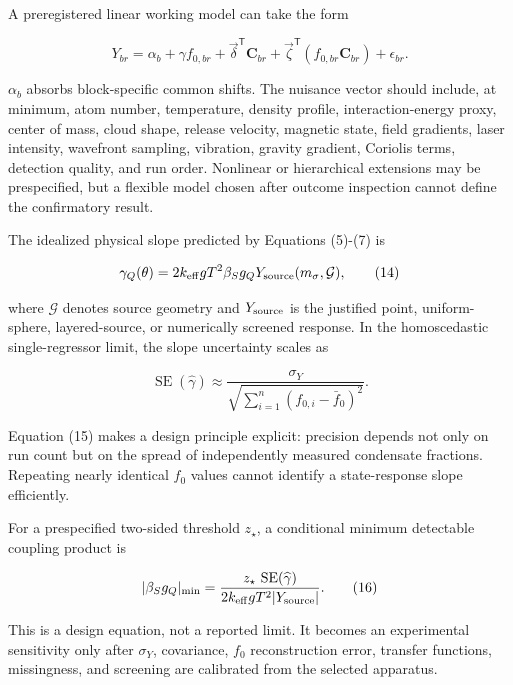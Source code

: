 \documentclass[
  american,
  11pt,
  letterpaper,
]{article}
\begin{document}
A preregistered linear working model can take the form

\begin{equation}
Y_{br}
=\alpha_b+\gamma f_{0,br}
+\vec{\delta}^{\mathsf T}\mathbf C_{br}
+\vec{\zeta}^{\mathsf T}
\left(f_{0,br}\mathbf C_{br}\right)
+\epsilon_{br}.
\tag{13}
\end{equation}

\(\alpha_b\) absorbs block-specific common shifts. The nuisance vector should include, at minimum, atom number, temperature, density profile, interaction-energy proxy, center of mass, cloud shape, release velocity, magnetic state, field gradients, laser intensity, wavefront sampling, vibration, gravity gradient, Coriolis terms, detection quality, and run order. Nonlinear or hierarchical extensions may be prespecified, but a flexible model chosen after outcome inspection cannot define the confirmatory result.

The idealized physical slope predicted by Equations (5)-(7) is

\begin{equation}
\gamma_Q(\theta)
=2k_{\rm eff}gT^2\beta_Sg_QY_{\rm source}(m_\sigma,\mathcal G),
\tag{14}
\end{equation}

where \(\mathcal G\) denotes source geometry and \(Y_{\rm source}\) is the justified point, uniform-sphere, layered-source, or numerically screened response. In the homoscedastic single-regressor limit, the slope uncertainty scales as

\begin{equation}
\operatorname{SE}(\widehat\gamma)
\approx
\frac{\sigma_Y}
{\sqrt{\sum_{i=1}^{n}(f_{0,i}-\bar f_0)^2}} .
\tag{15}
\end{equation}

Equation (15) makes a design principle explicit: precision depends not only on run count but on the spread of independently measured condensate fractions. Repeating nearly identical \(f_0\) values cannot identify a state-response slope efficiently.

For a prespecified two-sided threshold \(z_\star\), a conditional minimum detectable coupling product is

\begin{equation}
|\beta_Sg_Q|_{\min}
=\frac{z_\star\,\operatorname{SE}(\widehat\gamma)}
{2k_{\rm eff}gT^2|Y_{\rm source}|}.
\tag{16}
\end{equation}

This is a design equation, not a reported limit. It becomes an experimental sensitivity only after \(\sigma_Y\), covariance, \(f_0\) reconstruction error, transfer functions, missingness, and screening are calibrated from the selected apparatus.
\end{document}
